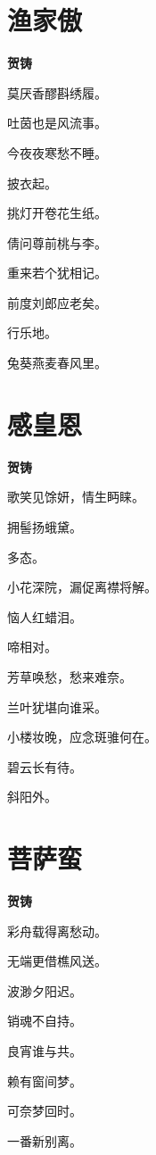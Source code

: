 \documentclass[12pt,a4paper]{ctexbook}
\begin{document}
\section{渔家傲}
\textbf{贺铸}\par\vspace{0.5em}
莫厌香醪斟绣履。\par
吐茵也是风流事。\par
今夜夜寒愁不睡。\par
披衣起。\par
挑灯开卷花生纸。\par
倩问尊前桃与李。\par
重来若个犹相记。\par
前度刘郎应老矣。\par
行乐地。\par
兔葵燕麦春风里。\par

\section{感皇恩}
\textbf{贺铸}\par\vspace{0.5em}
歌笑见馀妍，情生眄睐。\par
拥髻扬蛾黛。\par
多态。\par
小花深院，漏促离襟将解。\par
恼人红蜡泪。\par
啼相对。\par
芳草唤愁，愁来难奈。\par
兰叶犹堪向谁采。\par
小楼妆晚，应念斑骓何在。\par
碧云长有待。\par
斜阳外。\par

\section{菩萨蛮}
\textbf{贺铸}\par\vspace{0.5em}
彩舟载得离愁动。\par
无端更借樵风送。\par
波渺夕阳迟。\par
销魂不自持。\par
良宵谁与共。\par
赖有窗间梦。\par
可奈梦回时。\par
一番新别离。\par
\end{document}
